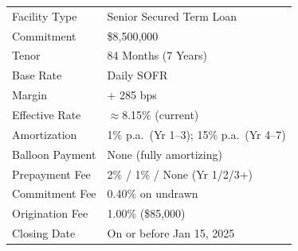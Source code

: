 \documentclass[11pt,a4paper]{article}
\begin{document}
\noindent
\begin{minipage}[t]{0.47\textwidth}
  \vspace{0pt}
  \begin{tcolorbox}[creditbox, title={\faFile\enspace Facility Terms}]
    \small
    \renewcommand{\arraystretch}{1.25}
    \begin{tabular}{@{} L{3.2cm} L{2.8cm} @{}}
      Facility Type      & Senior Secured Term Loan \\
      Commitment         & \$8,500,000 \\
      Tenor              & 84 Months (7 Years) \\
      Base Rate          & Daily SOFR \\
      Margin             & + 285 bps \\
      Effective Rate     & $\approx$8.15\% (current) \\
      Amortization       & 1\% p.a.\ (Yr 1--3); 15\% p.a.\ (Yr 4--7) \\
      Balloon Payment    & None (fully amortizing) \\
      Prepayment Fee     & 2\% / 1\% / None (Yr 1/2/3+) \\
      Commitment Fee     & 0.40\% on undrawn \\
      Origination Fee    & 1.00\% (\$85,000) \\
      Closing Date       & On or before Jan 15, 2025 \\
    \end{tabular}
  \end{tcolorbox}
\end{minipage}%
\hfill
\end{document}
